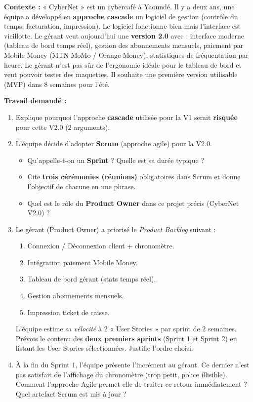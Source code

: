 \documentclass[11pt]{article}
\begin{document}
\begin{exercice}
\textbf{Contexte :} « CyberNet » est un cybercafé à Yaoundé. Il y a deux ans, une équipe a développé en \textbf{approche cascade} un logiciel de gestion (contrôle du temps, facturation, impression). Le logiciel fonctionne bien mais l'interface est vieillotte. Le gérant veut aujourd'hui une \textbf{version 2.0} avec : interface moderne (tableau de bord temps réel), gestion des abonnements mensuels, paiement par Mobile Money (MTN MoMo / Orange Money), statistiques de fréquentation par heure. Le gérant n'est pas sûr de l'ergonomie idéale pour le tableau de bord et veut pouvoir tester des maquettes. Il souhaite une première version utilisable (MVP) dans 8 semaines pour l'été.

\textbf{Travail demandé :}
\begin{enumerate}
    \item Explique pourquoi l'approche \textbf{cascade} utilisée pour la V1 serait \textbf{risquée} pour cette V2.0 (2 arguments).
    \item L'équipe décide d'adopter \textbf{Scrum} (approche agile) pour la V2.0.
    \begin{itemize}
        \item[a)] Qu'appelle-t-on un \textbf{Sprint} ? Quelle est sa durée typique ?
        \item[b)] Cite \textbf{trois cérémonies (réunions)} obligatoires dans Scrum et donne l'objectif de chacune en une phrase.
        \item[c)] Quel est le rôle du \textbf{Product Owner} dans ce projet précis (CyberNet V2.0) ?
    \end{itemize}
    \item Le gérant (Product Owner) a priorisé le \textit{Product Backlog} suivant :
    \begin{enumerate}
        \item Connexion / Déconnexion client + chronomètre.
        \item Intégration paiement Mobile Money.
        \item Tableau de bord gérant (stats temps réel).
        \item Gestion abonnements mensuels.
        \item Impression ticket de caisse.
    \end{enumerate}
    L'équipe estime sa \textit{vélocité} à 2 « User Stories » par sprint de 2 semaines. Prévois le contenu des \textbf{deux premiers sprints} (Sprint 1 et Sprint 2) en listant les User Stories sélectionnées. Justifie l'ordre choisi.
    \item À la fin du Sprint 1, l'équipe présente l'incrément au gérant. Ce dernier n'est pas satisfait de l'affichage du chronomètre (trop petit, police illisible). Comment l'approche Agile permet-elle de traiter ce retour immédiatement ? Quel artefact Scrum est mis à jour ?
\end{enumerate}
\end{exercice}
\end{document}
